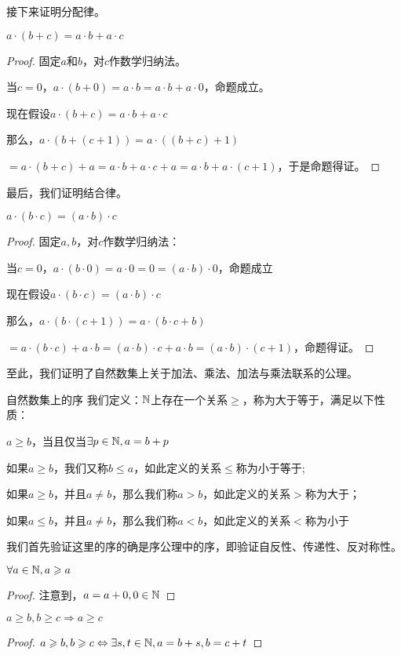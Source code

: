 \documentclass[12pt, a4paper, oneside, UTF8]{ctexbook}
\begin{document}
\begin{para}{0}
					接下来证明分配律。
					\begin{proposition}{}{}
						$a\cdot (b+c)=a\cdot b+a\cdot c$
					\end{proposition}
					\begin{proof}
						固定$a$和$b$，对$c$作数学归纳法。
						
						当$c=0$，$a\cdot (b+0)=a\cdot b=a\cdot b+a\cdot 0$，命题成立。
						
						现在假设$a\cdot (b+c)=a\cdot b+a\cdot c$
						
						那么，$a\cdot \left(b+(c+1)\right)=a\cdot \left((b+c)+1\right)$
						
						$=a\cdot (b+c)+a=a\cdot b+a\cdot c+a=a\cdot b+a\cdot (c+1)$，于是命题得证。
					\end{proof}
					最后，我们证明结合律。
					\begin{proposition}{}{}
						$a\cdot (b\cdot c)=(a\cdot b)\cdot c$
					\end{proposition}
					\begin{proof}
						固定$a,b$，对$c$作数学归纳法：
						
						当$c=0$，$a\cdot (b\cdot 0)=a\cdot 0=0=(a\cdot b)\cdot 0$，命题成立
						
						现在假设$a\cdot (b\cdot c)=(a\cdot b)\cdot c$
						
						那么，$a\cdot \left(b\cdot (c+1)\right)=a\cdot (b\cdot c+b)$
						
						$=a\cdot (b\cdot c)+a\cdot b=(a\cdot b)\cdot c+a\cdot b=(a\cdot b)\cdot (c+1)$，命题得证。
					\end{proof}
					至此，我们证明了自然数集上关于加法、乘法、加法与乘法联系的公理。
					\begin{defn}{自然数集上的序}{}
						我们定义：$\mathbb{N}$上存在一个关系$\geqslant$，称为大于等于，满足以下性质：
						
						$a \geqslant b$，当且仅当$\exists p \in \mathbb{N},a=b+p$
						
						如果$a \geqslant b$，我们又称$b \leqslant a$，如此定义的关系$\leqslant$称为小于等于;
						
						如果$a \geqslant b$，并且$a \neq b$，那么我们称$a > b$，如此定义的关系$>$称为大于；
						
						如果$a \leqslant b$，并且$a \neq b$，那么我们称$a < b$，如此定义的关系$<$称为小于
					\end{defn}
					我们首先验证这里的序的确是序公理中的序，即验证自反性、传递性、反对称性。
					\begin{proposition}
						$\forall a\in \mathbb{N},a \geqslant a$
					\end{proposition}
					\begin{proof}
						注意到，$a=a+0,0\in\mathbb{N}$
					\end{proof}
					\begin{proposition}
						$a \geqslant b,b\geqslant c \Rightarrow a\geqslant c$
					\end{proposition}
					\begin{proof}
						$a \geqslant b,b\geqslant c \Leftrightarrow \exists s,t\in \mathbb{N},a=b+s,b=c+t$
						

\end{proof}
\end{para}
\end{document}
